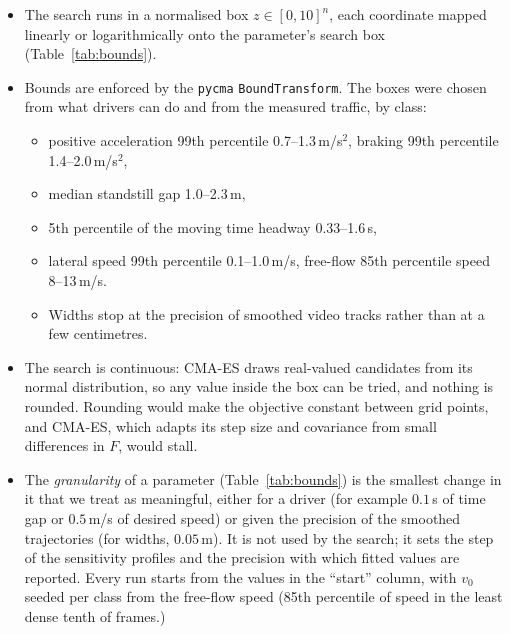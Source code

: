 \documentclass[11pt]{article}
\begin{document}
\begin{itemize}
    \item The search runs in a normalised box $z\in[0,10]^n$, each coordinate mapped
linearly or logarithmically onto the parameter's search box
(Table~\ref{tab:bounds}).
\item 
 Bounds are enforced by the \texttt{pycma}
\texttt{BoundTransform}. The boxes were chosen from what drivers can do and
from the measured traffic, by class:
\begin{itemize}
    \item  positive acceleration 99th percentile
0.7--1.3\,m/s$^2$, braking 99th percentile 1.4--2.0\,m/s$^2$,
    \item  median standstill
gap 1.0--2.3\,m,
\item 5th percentile of the moving time headway 0.33--1.6\,s,
\item lateral speed 99th percentile 0.1--1.0\,m/s, free-flow 85th percentile speed
8--13\,m/s.
\item  Widths stop at the precision of smoothed video tracks rather than at
a few centimetres.
\end{itemize} 
\item The search is continuous: CMA-ES draws real-valued candidates from its
normal distribution, so any value inside the box can be tried, and nothing is
rounded. Rounding would make the objective constant between grid points, and
CMA-ES, which adapts its step size and covariance from small differences in
$F$, would stall.
\item The \emph{granularity} of a parameter (Table~\ref{tab:bounds}) is the
smallest change in it that we treat as meaningful, either for a driver (for
example $0.1$\,s of time gap or $0.5$\,m/s of desired speed) or given the
precision of the smoothed trajectories (for widths, $0.05$\,m). It is not used
by the search; it sets the step of the sensitivity profiles and the precision
with which fitted values are reported. Every run starts from the values in the ``start''
column, with $v_0$ seeded per class from the free-flow speed (85th percentile of
speed in the least dense tenth of frames.)
\end{itemize}

\begin{table}[H]\centering\footnotesize
\caption{Search box, scale, starting value and granularity of every
parameter. $^{a}$\,Free-flow speed of the class.}
\label{tab:bounds}

\end{table}
\end{document}
